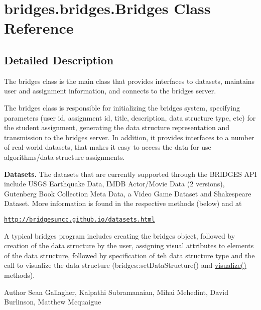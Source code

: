 \hypertarget{classbridges_1_1bridges_1_1_bridges}{}\section{bridges.\+bridges.\+Bridges Class Reference}
\label{classbridges_1_1bridges_1_1_bridges}


\subsection{Detailed Description}
The bridges class is the main class that provides interfaces to datasets, maintains user and assignment information, and connects to the bridges server. 

The bridges class is responsible for initializing the bridges system, specifying parameters (user id, assignment id, title, description, data structure type, etc) for the student assignment, generating the data structure representation and transmission to the bridges server. In addition, it provides interfaces to a number of real-\/world datasets, that makes it easy to access the data for use algorithms/data structure assignments. ~\newline


{\bfseries Datasets.} The datasets that are currently supported through the B\+R\+I\+D\+G\+ES A\+PI include U\+S\+GS Earthquake Data, I\+M\+DB Actor/\+Movie Data (2 versions), Gutenberg Book Collection Meta Data, a Video Game Dataset and Shakespeare Dataset. More information is found in the respective methods (below) and at 

\href{http://bridgesuncc.github.io/datasets.html}{\tt http\+://bridgesuncc.\+github.\+io/datasets.\+html} 

A typical bridges program includes creating the bridges object, followed by creation of the data structure by the user, assigning visual attributes to elements of the data structure, followed by specification of teh data structure type and the call to visualize the data structure (bridges\+::set\+Data\+Structure() and \hyperlink{classbridges_1_1bridges_1_1_bridges_a3c1321f8be7b249639a47eba10b67c70}{visualize()} methods).

\begin{DoxyAuthor}{Author}
Sean Gallagher, Kalpathi Subramanaian, Mihai Mehedint, David Burlinson, Matthew Mcquaigue 
\end{DoxyAuthor}
